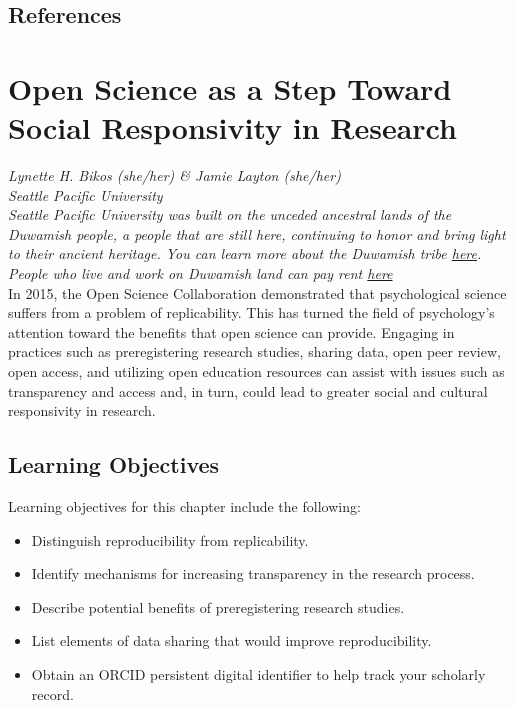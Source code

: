 \documentclass[
  11pt,
]{book}
\providecommand{\tightlist}{%
  \setlength{\itemsep}{0pt}\setlength{\parskip}{0pt}}
\begin{document}
\hypertarget{references}{%
\section{References}\label{references}}

\hypertarget{OpSci}{%
\chapter{Open Science as a Step Toward Social Responsivity in Research}\label{OpSci}}

\emph{Lynette H. Bikos (she/her) \& Jamie Layton (she/her)}\\
\emph{Seattle Pacific University}\\
\emph{Seattle Pacific University was built on the unceded ancestral lands of the Duwamish people, a people that are still here, continuing to honor and bring light to their ancient heritage. You can learn more about the Duwamish tribe \href{https://www.duwamishtribe.org/}{here}. People who live and work on Duwamish land can pay rent \href{https://www.realrentduwamish.org/}{here}}\\

In 2015, the Open Science Collaboration demonstrated that psychological science suffers from a problem of replicability. This has turned the field of psychology's attention toward the benefits that open science can provide. Engaging in practices such as preregistering research studies, sharing data, open peer review, open access, and utilizing open education resources can assist with issues such as transparency and access and, in turn, could lead to greater social and cultural responsivity in research.

\hypertarget{learning-objectives-1}{%
\section{Learning Objectives}\label{learning-objectives-1}}

Learning objectives for this chapter include the following:

\begin{itemize}
\tightlist
\item
  Distinguish reproducibility from replicability.
\item
  Identify mechanisms for increasing transparency in the research process.
\item
  Describe potential benefits of preregistering research studies.
\item
  List elements of data sharing that would improve reproducibility.
\item
  Obtain an ORCID persistent digital identifier to help track your scholarly record.
\end{itemize}
\end{document}
